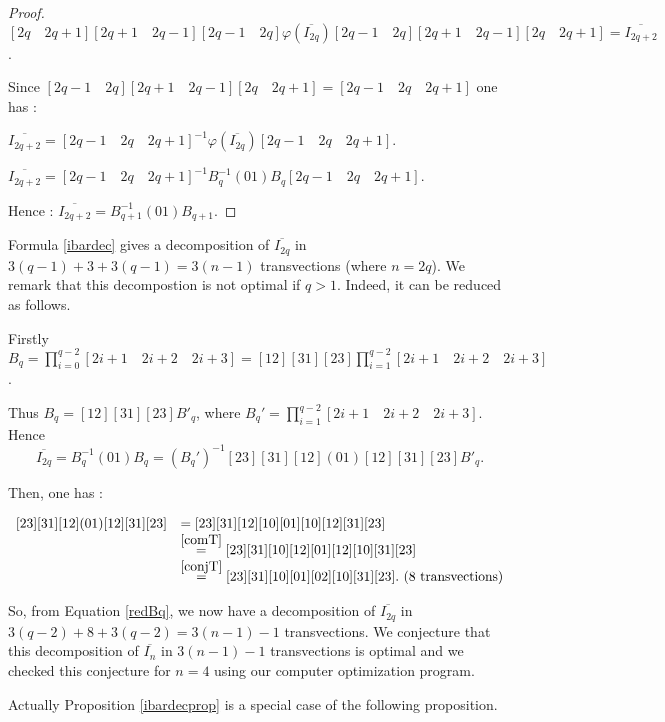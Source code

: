 \documentclass[a4paper,12pt,fleqn]{article}
\renewcommand\phi{\varphi}
\begin{document}
\begin{proof}
  $[2q\quad 2q+1][2q+1\quad 2q-1][2q-1\quad 2q]\phi(\overline{I_{2q}})[2q-1\quad 2q][2q+1\quad 2q-1][2q\quad 2q+1]=\overline{I_{2q+2}}$.

  Since $[2q-1\quad 2q][2q+1\quad 2q-1][2q\quad 2q+1]=[2q-1\quad 2q\quad 2q+1]$ one has :

  $\overline{I_{2q+2}}=[2q-1\quad 2q\quad 2q+1]^{-1}\phi(\overline{I_{2q}})[2q-1\quad 2q\quad 2q+1]$.

  $\overline{I_{2q+2}}=[2q-1\quad 2q\quad 2q+1]^{-1}B_q^{-1}(01)B_q[2q-1\quad 2q\quad 2q+1]$.

  Hence : $\overline{I_{2q+2}}=B_{q+1}^{-1}(01)B_{q+1}$.
\end{proof}

Formula \eqref{ibardec} gives a decomposition of $\overline{I_{2q}}$ in $3(q-1)+3+3(q-1)=3(n-1)$ transvections (where $n=2q$). We remark that this decompostion is not optimal if $q>1$.
Indeed, it can be reduced as follows.

Firstly 
$B_q=\prod\limits_{i=0}^{q-2}[2i+1\quad 2i+2\quad 2i+3]=[12][31][23]\prod\limits_{i=1}^{q-2}[2i+1\quad 2i+2\quad 2i+3]$.

Thus $B_q=[12][31][23]B'_q$, where $B_q'=\prod\limits_{i=1}^{q-2}[2i+1\quad 2i+2\quad 2i+3]$. Hence
\begin{equation}
\overline{I_{2q}}=B_q^{-1}(01)B_q=(B_q')^{-1}[23][31][12](01)[12][31][23]B'_q.\label{redBq}
\end{equation}

Then, one has :

$\begin{array}{ll}
[23][31][12](01)[12][31][23]&=[23][31][12][10][01][10][12][31][23]\\

                            &\stackrel{\ref{comT}}{=}[23][31][10][12][01][12][10][31][23]\\

                            &\stackrel{\ref{conjT}}{=}[23][31][10][01][02][10][31][23]. \text{ (8 transvections)}
 \end{array}$ 


 So, from Equation \eqref{redBq}, we now have a decomposition of $\overline{I_{2q}}$ in $3(q-2)+8+3(q-2)=3(n-1)-1$ transvections. We conjecture that this decomposition of $\overline{I_n}$ in $3(n-1)-1$ transvections is optimal and we checked this conjecture for $n=4$ using our computer optimization program.\medskip 

Actually Proposition \ref{ibardecprop} is a special case of the following proposition.
\end{document}
